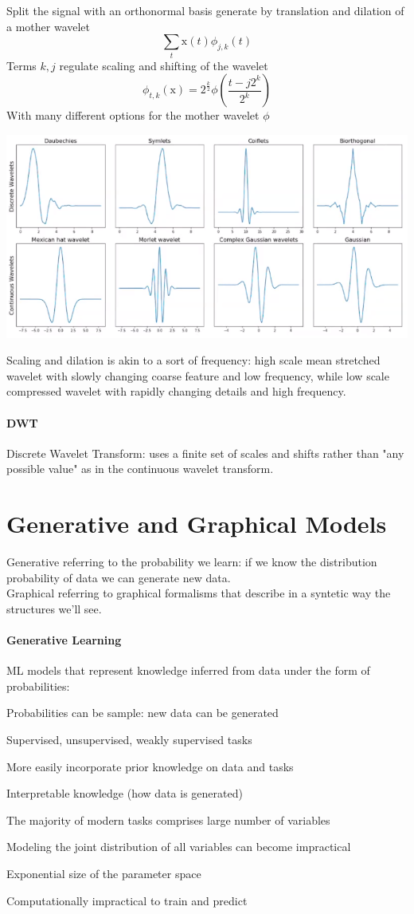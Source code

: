 \documentclass[10pt]{report}
\begin{document}
Split the signal with an orthonormal basis generate by translation and dilation of a mother wavelet $$\sum_t \text{x}(t)\phi_{j,k}(t)$$
Terms $k,j$ regulate scaling and shifting of the wavelet
$$\phi_{t,k}(\text{x}) = 2^{\frac{k}{2}}\phi\left(\frac{t-j2^k}{2^k}\right)$$
With many different options for the mother wavelet $\phi$
\begin{center}
	\includegraphics[scale=0.5]{13.png}
\end{center}
Scaling and dilation is akin to a sort of frequency: high scale mean stretched wavelet with slowly changing coarse feature and low frequency, while low scale compressed wavelet with rapidly changing details and high frequency.
\paragraph{DWT} Discrete Wavelet Transform: uses a finite set of scales and shifts rather than "any possible value" as in the continuous wavelet transform.
\section{Generative and Graphical Models}
Generative referring to the probability we learn: if we know the distribution probability of data we can generate new data.\\
Graphical referring to graphical formalisms that describe in a syntetic way the structures we'll see.
\paragraph{Generative Learning} ML models that represent knowledge inferred from data under the form of probabilities:
\begin{list}{}{}
	\item Probabilities can be sample: new data can be generated
	\item Supervised, unsupervised, weakly supervised tasks
	\item More easily incorporate prior knowledge on data and tasks
	\item Interpretable knowledge (how data is generated)
\end{list}
The majority of modern tasks comprises large number of variables\begin{list}{}{}
	\item Modeling the joint distribution of all variables can become impractical
	\item Exponential size of the parameter space
	\item Computationally impractical to train and predict
\end{list}
\end{document}
